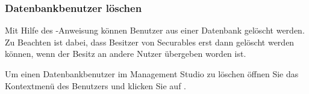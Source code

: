          \subsubsection{Datenbankbenutzer löschen}
            Mit Hilfe des -Anweisung können Benutzer
            aus einer Datenbank gelöscht werden. Zu Beachten ist dabei, dass
            Besitzer von Securables erst dann gelöscht werden können, wenn der
            Besitz an andere Nutzer übergeben worden ist.
            
            Um einen Datenbankbenutzer im Management Studio zu löschen öffnen
            Sie das Kontextmenü des Benutzers und klicken Sie auf
            .
            \begin{literaturinternet}
              \item \cite{ms189438}
            \end{literaturinternet}            
